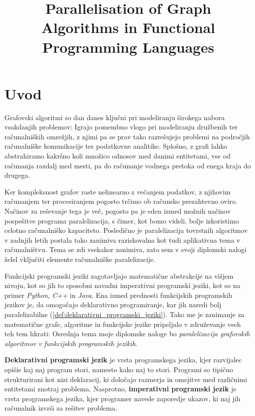 \documentclass[mat1, tisk]{fmfdelo}
\title{Parallelisation of Graph Algorithms in Functional Programming Languages}
\begin{document}
\section{Uvod}

Grafovski algoritmi so dan danes ključni pri modeliranju širokega nabora vsakdanjih problemov: 
Igrajo pomembno vlogo pri modeliranju družbenih ter računalniških omrežjih, z njimi pa se prav tako razrešujejo 
problemi na področjih računalniške komunikacije ter podatkovne analitike. Splošno, z grafi lahko abstrahiramo kakršno 
koli množico odnosov med danimi entitetami, vse od računanja razdalj med mesti, pa do računanje vodnega pretoka 
od enega kraja do drugega.

Ker kompleksnost grafov raste nelinearno z večanjem podatkov, z njihovim računanjem ter procesiranjem pogosto trčimo
ob računsko prezahtevno oviro. Načinov za reševanje tega je več, pogosto pa je eden izmed možnih načinov pospešitve
programa paralelizacija, s čimer, kot bomo videli, bolje izkoristimo celotno računalniško kapaciteto.
Posledično je paralelizacija tovrstnih algoritmov v zadnjih letih postala tako zanimiva raziskovalna kot
tudi aplikativna tema v računalništvu.  Tema se zdi vsekakor zanimiva, zato sem v svoji diplomski nalogi želel 
vključiti elemente računalniške paralelizacije.

Funkcijski programski jeziki zagotavljajo matematične abstrakcije na višjem nivoju, kot so jih to sposobni navadni
imperativni programski jeziki, kot so na primer \textit{Python}, \textit{C++} in \textit{Java}. 
Ena izmed prednosti funkcijskih programskih jezikov je, da omogočajo deklarativno programiranje, 
kar jih naredi bolj paralelizabilne (\ref{def:deklarativni_programski_jeziki}). Tako me je zanimanje za matematične grafe, algoritme
in funkcijske jezike pripeljalo v združevanje vseh teh tem hkrati: Osrednja tema moje diplomske naloge bo
\textit{paralelizacija grafovskih algoritmov v funkcijskih programskih jezikih}.

\begin{definicija} \label{def:deklarativni_programski_jeziki}
  \textbf{Deklarativni programski jezik} je vrsta programskega jezika, kjer razvijalec opišie kaj naj program stori, 
  namesto kako naj to stori. Programi so tipično strukturirani kot nizi deklaracij, ki določajo razmerja in omejitve
  med različnimi entitetami znotraj problema. 
  Nasprotno, \textbf{imperativni programski jezik} je vrsta programskega jezika, kjer programer navede zaporedje ukazov,
  ki naj jih računalnik izvrši za rešitev problema.
\end{definicija}
\end{document}
